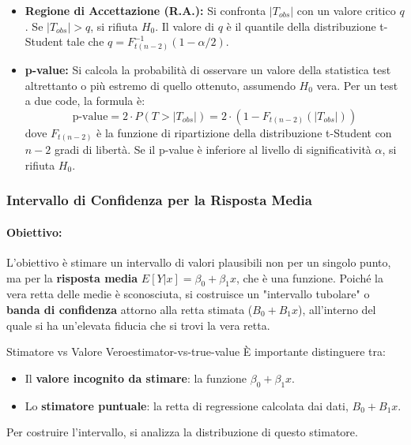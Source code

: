 \begin{itemize}
	\item \textbf{Regione di Accettazione (R.A.):} Si confronta \(|T_{obs}|\)
	      con un valore critico \(q\). Se \(|T_{obs}| > q\), si rifiuta \(H_0\). Il
	      valore di \(q\) è il quantile della distribuzione t-Student tale che \(q =
	      F_{t(n-2)}^{-1}(1-\alpha/2)\).

	\item \textbf{p-value:} Si calcola la probabilità di osservare un valore
	      della statistica test altrettanto o più estremo di quello ottenuto,
	      assumendo \(H_0\) vera. Per un test a due code, la formula è:
	      \[
		      \text{p-value} = 2 \cdot P(T > |T_{obs}|) = 2 \cdot (1 -
		      F_{t(n-2)}(|T_{obs}|))
	      \]
	      dove \(F_{t(n-2)}\) è la funzione di ripartizione della distribuzione
	      t-Student con \(n-2\) gradi di libertà. Se il p-value è inferiore al
	      livello di significatività \(\alpha\), si rifiuta \(H_0\).
\end{itemize}

\subsubsection{Intervallo di Confidenza per la Risposta Media}

\paragraph{Obiettivo:} L'obiettivo è stimare un intervallo di valori plausibili
non per un singolo punto, ma per la \textbf{risposta media} \(E[Y|x] = \beta_0 +
\beta_1 x\), che è una funzione. Poiché la vera retta delle medie è
sconosciuta, si costruisce un "intervallo tubolare" o \textbf{banda di
	confidenza} attorno alla retta stimata (\(B_0 + B_1x\)), all'interno del quale
si ha un'elevata fiducia che si trovi la vera retta.

\begin{nota}{Stimatore vs Valore Vero}{estimator-vs-true-value}
	È importante distinguere tra:
	\begin{itemize}
		\item Il \textbf{valore incognito da stimare}: la funzione \( \beta_0 +
		      \beta_1 x \).
		\item Lo \textbf{stimatore puntuale}: la retta di regressione calcolata
		      dai dati, \( B_0 + B_1 x \).
	\end{itemize}
	Per costruire l'intervallo, si analizza la distribuzione di questo
	stimatore.
\end{nota}

